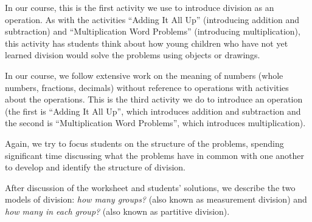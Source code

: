 \documentclass[nooutcomes,noauthor,handout]{ximera}
\begin{document}
\newpage

\begin{instructorNotes}
In our course, this is the first activity we use to introduce division as an operation.  As with the activities ``Adding It All Up'' (introducing addition and subtraction) and ``Multiplication Word Problems'' (introducing multiplication), this activity has students think about how young children who have not yet learned division would solve the problems using objects or drawings.

In our course, we follow extensive work on the meaning of numbers (whole numbers, fractions, decimals) without reference to operations with activities about the operations.  This is the third activity we do to introduce an operation (the first is ``Adding It All Up'', which introduces addition and subtraction and the second is ``Multiplication Word Problems'', which introduces multiplication). 

Again, we try to focus students on the structure of the problems, spending significant time discussing what the problems have in common with one another to develop and identify the structure of division.

After discussion of the worksheet and students' solutions, we describe the two models of division: {\em how many groups?} (also known as measurement division) and {\em how many in each group? } (also known as partitive division).


\end{instructorNotes}
\end{document}
